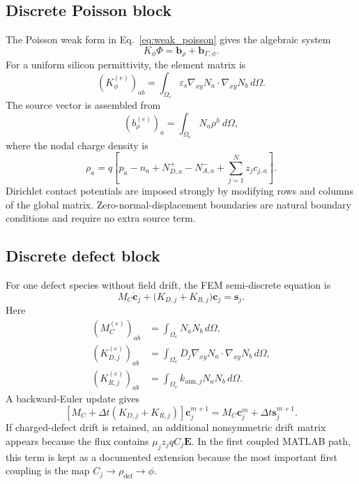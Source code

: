 \documentclass[11pt]{article}
\newcommand{\Evec}{\bm{E}}
\newcommand{\gradxy}{\nabla_{xy}}
\newcommand{\dt}{\Delta t}
\newcommand{\epss}{\varepsilon_{\mathrm{s}}}
\begin{document}
\subsection{Discrete Poisson block}

The Poisson weak form in Eq.~\eqref{eq:weak_poisson} gives the algebraic system
\begin{equation}
\boxed{K_{\phi}\Phi=\mathbf{b}_{\rho}+\mathbf{b}_{\Gamma,\phi}.}
\label{eq:module6_poisson_discrete}
\end{equation}
For a uniform silicon permittivity, the element matrix is
\begin{equation}
(K_{\phi}^{(e)})_{ab}
=\int_{\Omega_e}\epss\gradxy N_a\cdot\gradxy N_b\,d\Omega.
\end{equation}
The source vector is assembled from
\begin{equation}
(b_{\rho}^{(e)})_a
=\int_{\Omega_e}N_a\rho^h\,d\Omega,
\end{equation}
where the nodal charge density is
\begin{equation}
\rho_a=q\left[p_a-n_a+N_{D,a}^{+}-N_{A,a}^{-}+\sum_{j=1}^{N}z_jc_{j,a}\right].
\end{equation}
Dirichlet contact potentials are imposed strongly by modifying rows and columns of the global matrix. Zero-normal-displacement boundaries are natural boundary conditions and require no extra source term.

\subsection{Discrete defect block}

For one defect species without field drift, the FEM semi-discrete equation is
\begin{equation}
\boxed{M_C\dot{\mathbf{c}}_j+\bigl(K_{D,j}+K_{R,j}\bigr)\mathbf{c}_j=\mathbf{s}_j.}
\label{eq:module6_defect_discrete}
\end{equation}
Here
\begin{align}
(M_C^{(e)})_{ab} &= \int_{\Omega_e}N_aN_b\,d\Omega,\\
(K_{D,j}^{(e)})_{ab} &= \int_{\Omega_e}D_j\gradxy N_a\cdot\gradxy N_b\,d\Omega,\\
(K_{R,j}^{(e)})_{ab} &= \int_{\Omega_e}k_{\mathrm{ann},j}N_aN_b\,d\Omega.
\end{align}
A backward-Euler update gives
\begin{equation}
\boxed{
\left[M_C+\dt\left(K_{D,j}+K_{R,j}\right)\right]\mathbf{c}_j^{m+1}
=
M_C\mathbf{c}_j^m+\dt\mathbf{s}_j^{m+1}.}
\label{eq:module6_defect_be}
\end{equation}
If charged-defect drift is retained, an additional nonsymmetric drift matrix appears because the flux contains \(\mu_jz_jqC_j\Evec\). In the first coupled MATLAB path, this term is kept as a documented extension because the most important first coupling is the map \(C_j\rightarrow\rho_{\mathrm{def}}\rightarrow\phi\).
\end{document}
